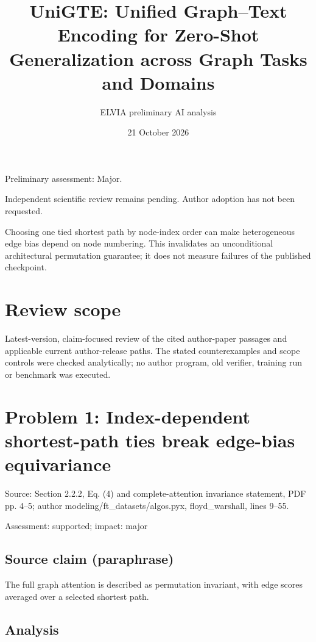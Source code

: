 \documentclass[11pt]{article}
\begin{document}
\title{UniGTE: Unified Graph–Text Encoding for Zero-Shot Generalization across Graph Tasks and Domains}

\author{ELVIA preliminary AI analysis}\date{21 October 2026}\maketitle

Preliminary assessment: Major.\par

Independent scientific review remains pending. Author adoption has not been requested.

Choosing one tied shortest path by node-index order can make heterogeneous edge bias depend on node numbering. This invalidates an unconditional architectural permutation guarantee; it does not measure failures of the published checkpoint.

\section*{Review scope}

Latest-version, claim-focused review of the cited author-paper passages and applicable current author-release paths. The stated counterexamples and scope controls were checked analytically; no author program, old verifier, training run or benchmark was executed.

\section*{Problem 1: Index-dependent shortest-path ties break edge-bias equivariance}

Source: Section 2.2.2, Eq. (4) and complete-attention invariance statement, PDF pp. 4–5; author modeling/ft\_datasets/algos.pyx, floyd\_warshall, lines 9–55.

Assessment: supported; impact: major

\subsection*{Source claim (paraphrase)}

The full graph attention is described as permutation invariant, with edge scores averaged over a selected shortest path.

\subsection*{Analysis}
\end{document}
